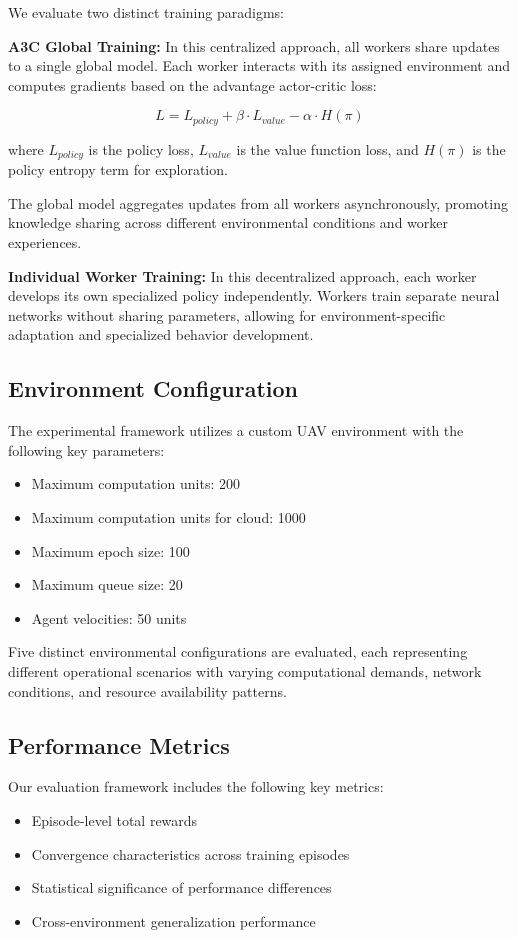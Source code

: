 \documentclass[journal]{IEEEtran}
\begin{document}
We evaluate two distinct training paradigms:

\textbf{A3C Global Training:} In this centralized approach, all workers share updates to a single global model. Each worker interacts with its assigned environment and computes gradients based on the advantage actor-critic loss:

\begin{equation}
L = L_{policy} + \beta \cdot L_{value} - \alpha \cdot H(\pi)
\end{equation}

where $L_{policy}$ is the policy loss, $L_{value}$ is the value function loss, and $H(\pi)$ is the policy entropy term for exploration.

The global model aggregates updates from all workers asynchronously, promoting knowledge sharing across different environmental conditions and worker experiences.

\textbf{Individual Worker Training:} In this decentralized approach, each worker develops its own specialized policy independently. Workers train separate neural networks without sharing parameters, allowing for environment-specific adaptation and specialized behavior development.

\subsection{Environment Configuration}

The experimental framework utilizes a custom UAV environment with the following key parameters:
\begin{itemize}
\item Maximum computation units: 200
\item Maximum computation units for cloud: 1000
\item Maximum epoch size: 100
\item Maximum queue size: 20
\item Agent velocities: 50 units
\end{itemize}

Five distinct environmental configurations are evaluated, each representing different operational scenarios with varying computational demands, network conditions, and resource availability patterns.

\subsection{Performance Metrics}
Our evaluation framework includes the following key metrics:
\begin{itemize}
\item Episode-level total rewards
\item Convergence characteristics across training episodes
\item Statistical significance of performance differences
\item Cross-environment generalization performance
\end{itemize}
\end{document}
